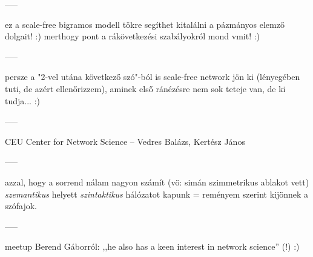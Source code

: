 \documentclass{llncs}
\begin{document}
-----

ez a scale-free bigramos modell tökre segíthet kitalálni a pázmányos
elemző dolgait! :) merthogy pont a rákövetkezési szabályokról mond vmit! :)

-----

persze a "2-vel utána következő szó"-ból is scale-free network jön ki
(lényegében tuti, de azért ellenőrizzem),
aminek első ránézésre nem sok teteje van, de ki tudja... :)

-----

CEU Center for Network Science -- Vedres Balázs, Kertész János

-----

azzal, hogy a sorrend nálam nagyon számít
(vö: \cite{kovacs2012magyar} simán szimmetrikus ablakot vett)
\emph{szemantikus} helyett \emph{szintaktikus} hálózatot kapunk
= reményem szerint kijönnek a szófajok.

-----

meetup Berend Gáborról:
,,he also has a keen interest in network science'' (!) :)





%


\end{document}
